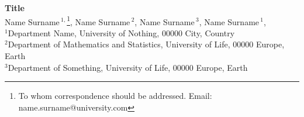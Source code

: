 \renewcommand*{\thefootnote}{\fnsymbol{footnote}}

\begin{flushleft}
{\Large\textbf{Title}}
\newline
\\
Name Surname\,\({}^{1,}\)\footnote{To whom correspondence should be addressed. Email: name.surname@university.com},
Name Surname\,\({}^{2}\),
Name Surname\,\({}^{3}\),
Name Surname\,\({}^{1}\),
\\
\({}^{1}\)Department Name, University of Nothing, 00000 City, Country
\\
\({}^{2}\)Department of Mathematics and Statistics, University of Life, 00000 Europe, Earth
\\
\({}^{3}\)Department of Something, University of Life, 00000 Europe, Earth
\end{flushleft}

\renewcommand*{\thefootnote}{\arabic{footnote}}
\setcounter{footnote}{0}
